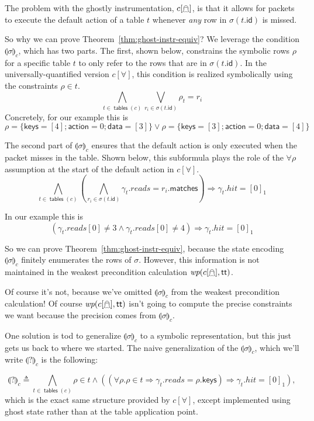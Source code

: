 \documentclass{article}
\newcommand{\TRUE}{\mathsf{tt}}
\newcommand{\matches}{\mathsf{matches}}
\newcommand{\action}{\mathsf{action}}
\newcommand{\keys}{\mathsf{keys}}
\newcommand{\data}{\mathsf{data}}
\newcommand{\id}{\mathsf{id}}
\newcommand{\hit}{\mathit{hit}}
\newcommand{\reads}{\mathit{reads}}
\newcommand{\WP}{\textit{wp}}
\newcommand{\state}[1]{\llparenthesis#1\rrparenthesis}
\newcommand{\instr}{[\forall]}
\newcommand{\ginstr}{[\mathghost]}
\newcommand{\tables}{\mathop{\mathsf{tables}}}
\begin{document}
The problem with the ghostly instrumentation, $c\ginstr$, is that it allows for
packets to execute the default action of a table $t$ whenever \emph{any} row in
$\sigma(t.\id)$ is missed.

So why we can prove Theorem~\ref{thm:ghost-instr-equiv}? We
leverage the condition $\state\sigma_c$, which has two parts. The first, shown
below, constrains the symbolic rows $\rho$ for a specific table $t$ to only
refer to the rows that are in $\sigma(t.\id)$. In the universally-quantified
version $c\instr$, this condition is realized symbolically using the constraints
$\rho \in t$.
\[ \bigwedge_{t \in \tables(c)} \bigvee_{r_i \in \sigma(t.\id)} \rho_t = r_i\]
Concretely, for our example this is
\[ \rho = \{\keys = [4]; \action = 0;\data = [3]\}\vee \rho = \{\keys = [3]; \action = 0; \data = [4]\} \]

The second part of $\state\sigma_c$ ensures that the default action is only
executed when the packet misses in the table. Shown below, this subformula plays
the role of the $\forall \rho$ assumption at the start of the default action in
$c\instr$.
\[\bigwedge_{t \in \tables(c)} \left(\bigwedge_{r_i \in \sigma(t.\id)} \gamma_t.\reads = r_i.\matches\right) \Rightarrow \gamma_t.\hit = [0]_1 \]

In our example this is
\[(\gamma_t.\reads[0] \neq 3 \wedge \gamma_t.\reads[0] \neq 4) \Rightarrow \gamma_t.\hit = [0]_1 \]

So we can prove Theorem~\ref{thm:ghost-instr-equiv}, because the state encoding
$\state\sigma_c$ finitely enumerates the rows of $\sigma$. However, this
information is not maintained in the weakest precondition calculation
$\WP(c\ginstr,\TRUE)$.

Of course it's not, because we've omitted $\state\sigma_c$ from the weakest
precondition calculation! Of course $\WP(c\ginstr,\TRUE)$ isn't going to compute
the precise constraints we want because the precision comes from $\state\sigma_c$.

One solution is tod to generalize $\state\sigma_c$ to a symbolic representation,
but this just gets us back to where we started. The naive generalization of the
$\state\sigma_c$, which we'll write $\state?_c$ is the following:

\[\state?_c \triangleq \bigwedge_{t \in \tables(c)} \rho \in t \wedge
((\forall \rho. \rho \in t \Rightarrow \gamma_t.\reads = \rho.\keys ) \Rightarrow \gamma_t.\hit = [0]_1),\]
\noindent which is the exact same structure provided by $c\instr$, except implemented using ghost state rather than at the table application point.
\end{document}
